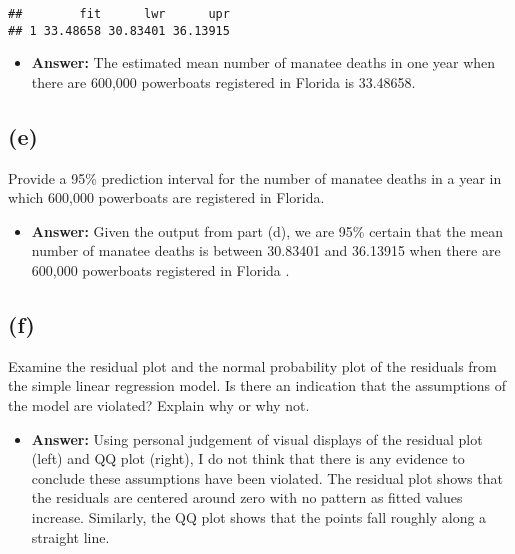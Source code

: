 \documentclass[]{article}
\providecommand{\tightlist}{%
  \setlength{\itemsep}{0pt}\setlength{\parskip}{0pt}}
\begin{document}
\begin{verbatim}
##        fit      lwr      upr
## 1 33.48658 30.83401 36.13915
\end{verbatim}

\begin{itemize}
\tightlist
\item
  \textbf{Answer:} The estimated mean number of manatee deaths in one
  year when there are 600,000 powerboats registered in Florida is
  33.48658.
\end{itemize}

\subsection{(e)}\label{e-3}

Provide a 95\% prediction interval for the number of manatee deaths in a
year in which 600,000 powerboats are registered in Florida.

\begin{itemize}
\tightlist
\item
  \textbf{Answer:} Given the output from part (d), we are 95\% certain
  that the mean number of manatee deaths is between 30.83401 and
  36.13915 when there are 600,000 powerboats registered in Florida .
\end{itemize}

\subsection{(f)}\label{f-3}

Examine the residual plot and the normal probability plot of the
residuals from the simple linear regression model. Is there an
indication that the assumptions of the model are violated? Explain why
or why not.

\begin{itemize}
\tightlist
\item
  \textbf{Answer:} Using personal judgement of visual displays of the
  residual plot (left) and QQ plot (right), I do not think that there is
  any evidence to conclude these assumptions have been violated. The
  residual plot shows that the residuals are centered around zero with
  no pattern as fitted values increase. Similarly, the QQ plot shows
  that the points fall roughly along a straight line.
\end{itemize}
\end{document}
